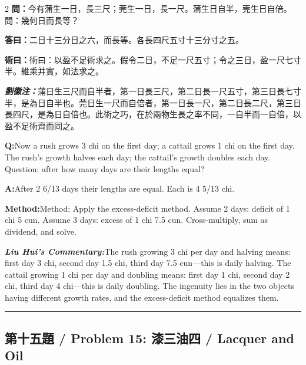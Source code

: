 \documentclass[11pt,a4paper]{article}
\newcommand{\cnwen}{\textcolor{cnlabelfg}{\textbf{問：}}}
\newcommand{\cnda}{\textbf{答曰：}}
\newcommand{\cnshu}{\textcolor{cnlabelfg}{\textbf{術曰：}}}
\newcommand{\cnzhu}{\textcolor{commentarycolor}{\textit{\textbf{劉徽注：}}}}
\newcommand{\enwen}{\textcolor{enlabelfg}{\textbf{Q:}}}
\newcommand{\enda}{\textcolor{enlabelfg}{\textbf{A:}}}
\newcommand{\enshu}{\textcolor{enlabelfg}{\textbf{Method:}}}
\newcommand{\enzhu}{\textcolor{enlabelfg}{\textit{\textbf{Liu Hui's Commentary:}}}}
\begin{document}
\begin{paracol}{2}
\switchcolumn[0]
\cnwen 今有蒲生一日，長三尺；莞生一日，長一尺。蒲生日自半，莞生日自倍。問：幾何日而長等？

\cnda 二日十三分日之六，而長等。各長四尺五寸十三分寸之五。

\cnshu 術曰：以盈不足術求之。假令二日，不足一尺五寸；令之三日，盈一尺七寸半。維乘并實，如法求之。

\cnzhu 蒲日生三尺而自半者，第一日長三尺，第二日長一尺五寸，第三日長七寸半，是為日自半也。莞日生一尺而自倍者，第一日長一尺，第二日長二尺，第三日長四尺，是為日自倍也。此術之巧，在於兩物生長之率不同，一自半而一自倍，以盈不足術齊而同之。

\switchcolumn[1]
\enwen Now a rush grows 3 chi on the first day; a cattail grows 1 chi on the first day. The rush's growth halves each day; the cattail's growth doubles each day. Question: after how many days are their lengths equal?

\enda After 2 6/13 days their lengths are equal. Each is 4 5/13 chi.

\enshu Method: Apply the excess-deficit method. Assume 2 days: deficit of 1 chi 5 cun. Assume 3 days: excess of 1 chi 7.5 cun. Cross-multiply, sum as dividend, and solve.

\enzhu The rush growing 3 chi per day and halving means: first day 3 chi, second day 1.5 chi, third day 7.5 cun---this is daily halving. The cattail growing 1 chi per day and doubling means: first day 1 chi, second day 2 chi, third day 4 chi---this is daily doubling. The ingenuity lies in the two objects having different growth rates, and the excess-deficit method equalizes them.
\end{paracol}

\bigskip\hrule\bigskip

\subsection{第十五題 / Problem 15: 漆三油四 / Lacquer and Oil}
\end{document}
